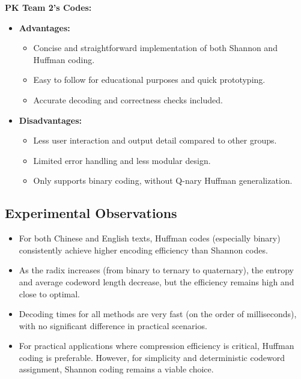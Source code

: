 \documentclass[12pt]{article}
\begin{document}
\textbf{PK Team 2's Codes:}
\begin{itemize}
    \item \textbf{Advantages:}
        \begin{itemize}
            \item Concise and straightforward implementation of both Shannon and Huffman coding.
            \item Easy to follow for educational purposes and quick prototyping.
            \item Accurate decoding and correctness checks included.
        \end{itemize}
    \item \textbf{Disadvantages:}
        \begin{itemize}
            \item Less user interaction and output detail compared to other groups.
            \item Limited error handling and less modular design.
            \item Only supports binary coding, without Q-nary Huffman generalization.
        \end{itemize}
\end{itemize}

\subsection{Experimental Observations}

\begin{itemize}
    \item For both Chinese and English texts, Huffman codes (especially binary) consistently achieve higher encoding efficiency than Shannon codes.
    \item As the radix increases (from binary to ternary to quaternary), the entropy and average codeword length decrease, but the efficiency remains high and close to optimal.
    \item Decoding times for all methods are very fast (on the order of milliseconds), with no significant difference in practical scenarios.
    \item For practical applications where compression efficiency is critical, Huffman coding is preferable. However, for simplicity and deterministic codeword assignment, Shannon coding remains a viable choice.
\end{itemize}
\end{document}
